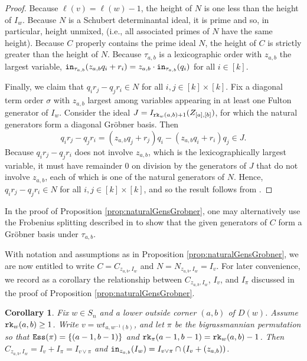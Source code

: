 \documentclass[12pt,reqno]{amsart}
\newtheorem{corollary}[theorem]{Corollary}
\newtheorem{Main Conjecture}[theorem]{Main Conjecture}
\theoremstyle{remark}
\theoremstyle{plain}
\newcommand{\init}{{\tt in}}
\newcommand{\ess}{{\tt Ess}}
\newcommand{\rk}{{\tt rk}}
\begin{document}
\begin{proof}
Because $\ell(v) = \ell(w)-1$, the height of $N$ is one less than the height of $I_w$.  Because $N$ is a Schubert determinantal ideal, it is prime and so, in particular, height unmixed, (i.e., all associated primes of $N$ have the same height).
Because $C$ properly contains the prime ideal $N$, the height of $C$ is strictly greater than the height of $N$.  Because $\tau_{a,b}$ is a lexicographic order with $z_{a,b}$ 
the largest variable, $\init_{\tau_{a,b}}(z_{a,b}q_i+r_i) = z_{a,b} \cdot \init_{\tau_{a,b}}(q_i)$ for all $i \in [k]$.  

Finally, we claim that $q_i r_j-q_jr_i \in N$ for all $i,j \in [k] \times [k]$.  Fix a diagonal term order $\sigma$ with $z_{a,b}$ largest among variables appearing in at least one Fulton generator of $I_w$.  Consider the ideal $J =I_{\rk_w(a,b)+1}(Z_{[a],[b]})$, for which the natural generators form a diagonal Gr\"obner basis.  Then \[
q_i r_j-q_jr_i = (z_{a,b}q_j+r_j)q_i-(z_{a,b}q_i+r_i)q_j \in J.
\]
Because $q_i r_j-q_jr_i$ does not involve $z_{a,b}$, which is the lexicographically  largest variable, 
it must have remainder $0$ on division by the generators of $J$ that do not involve $z_{a,b}$, each of which is one of the natural generators of $N$.  Hence, $q_i r_j-q_jr_i \in N$ for all $i,j \in [k] \times [k]$, and so  the result follows from \cite[Corollary 4.13]{KR}.
\end{proof}

In the proof of Proposition \ref{prop:naturalGensGrobner}, one may alternatively use the Frobenius splitting described in \cite[Section~7.2]{Knu09} to show that the given generators of $C$
form a Gr\"obner basis 
under $\tau_{a,b}$.

With notation and assumptions as in Proposition \ref{prop:naturalGensGrobner}, we are now entitled to write $C = C_{z_{a,b},I_w}$ and $N = N_{z_{a,b},I_w} = I_v$. For later convenience, we record as a corollary the relationship between $C_{z_{a,b},I_w}$, $I_v$, and $I_\pi$ discussed in the proof of Proposition \ref{prop:naturalGensGrobner}.


\begin{corollary}\label{cor:formOfC}
Fix $w \in S_n$ and a lower outside corner $(a,b)$ of $D(w)$.  Assume $\rk_w(a,b)\geq 1$. 
Write $v = wt_{a, w^{-1}(b)}$, and let $\pi$ be the bigrassmannian permutation so that $\ess(\pi)=\{(a-1,b-1)\}$ and $\rk_\pi(a-1,b-1)=\rk_w(a,b)-1$.   Then $C_{z_{a,b},I_w} = I_v+I_\pi = I_{v \vee \pi}$ and $\init_{z_{a,b}} (I_w) = I_{v \vee \pi} \cap (I_v+(z_{a,b}))$.
\end{corollary} 
\end{document}

